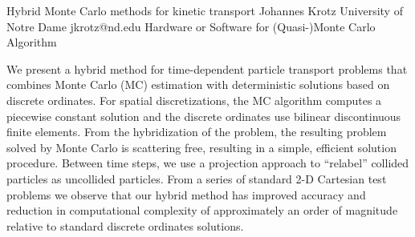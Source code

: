 \begin{talk}


\end{talk}

\begin{talk}
  {Hybrid Monte Carlo methods for kinetic transport}%
  {Johannes Krotz}%
  {University of Notre Dame}%
  {jkrotz@nd.edu}%
  {}%
  {Hardware or Software for (Quasi-)Monte Carlo Algorithm}%
    
   

We present a hybrid method for time-dependent particle transport problems that combines Monte Carlo (MC) estimation with deterministic solutions based on discrete ordinates. For spatial discretizations, the MC algorithm computes a piecewise constant solution and the discrete ordinates use bilinear discontinuous finite elements. From the hybridization of the problem, the resulting problem solved by Monte Carlo is scattering free, resulting in a simple, efficient solution procedure. Between time steps, we use a projection approach to “relabel” collided particles as uncollided particles. From a series of standard 2-D Cartesian test problems we observe that our hybrid method has improved accuracy and reduction in computational complexity of approximately an order of magnitude relative to standard discrete ordinates solutions.

\end{talk}

